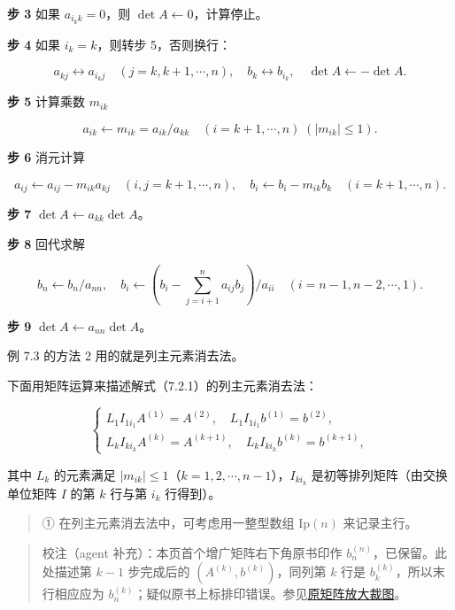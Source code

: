 \textbf{步 3} 如果 \(a_{i_kk}=0\)，则 \(\det A\leftarrow0\)，计算停止。

\textbf{步 4} 如果 \(i_k=k\)，则转步 5，否则换行：

\[a_{kj}\leftrightarrow a_{i_kj}\quad(j=k,k+1,\cdots,n),\quad b_k\leftrightarrow b_{i_k},\quad \det A\leftarrow-\det A.\]

\textbf{步 5} 计算乘数 \(m_{ik}\)

\[a_{ik}\leftarrow m_{ik}=a_{ik}/a_{kk}\quad(i=k+1,\cdots,n)\;(|m_{ik}|\le1).\]

\textbf{步 6} 消元计算

\[a_{ij}\leftarrow a_{ij}-m_{ik}a_{kj}\quad(i,j=k+1,\cdots,n),\quad b_i\leftarrow b_i-m_{ik}b_k\quad(i=k+1,\cdots,n).\]

\textbf{步 7} \(\det A\leftarrow a_{kk}\det A\)。

\textbf{步 8} 回代求解

\[b_n\leftarrow b_n/a_{nn},\quad b_i\leftarrow\left(b_i-\sum_{j=i+1}^{n}a_{ij}b_j\right)/a_{ii}\quad(i=n-1,n-2,\cdots,1).\]

\textbf{步 9} \(\det A\leftarrow a_{nn}\det A\)。

例 7.3 的方法 2 用的就是列主元素消去法。

下面用矩阵运算来描述解式（7.2.1）的列主元素消去法：

\[
\begin{cases}
L_1I_{1i_1}A^{(1)}=A^{(2)},\quad L_1I_{1i_1}b^{(1)}=b^{(2)},\\
L_kI_{ki_k}A^{(k)}=A^{(k+1)},\quad L_kI_{ki_k}b^{(k)}=b^{(k+1)},
\end{cases}
\tag{7.3.1}
\]

其中 \(L_k\) 的元素满足 \(|m_{ik}|\le1\)（\(k=1,2,\cdots,n-1\)），\(I_{ki_k}\) 是初等排列矩阵（由交换单位矩阵 \(I\) 的第 \(k\) 行与第 \(i_k\) 行得到）。

\begin{quote}
① 在列主元素消去法中，可考虑用一整型数组 \(\mathrm{Ip}(n)\) 来记录主行。
\end{quote}

\begin{quote}
校注（agent 补充）：本页首个增广矩阵右下角原书印作 \(b_n^{(n)}\)，已保留。此处描述第 \(k-1\) 步完成后的 \((A^{(k)},b^{(k)})\)，同列第 \(k\) 行是 \(b_k^{(k)}\)，所以末行相应应为 \(b_n^{(k)}\)；疑似原书上标排印错误。参见\href{verified/assets/ch07a/pdf-187-rhs-detail.png}{原矩阵放大裁图}。
\end{quote}

\clearpage


